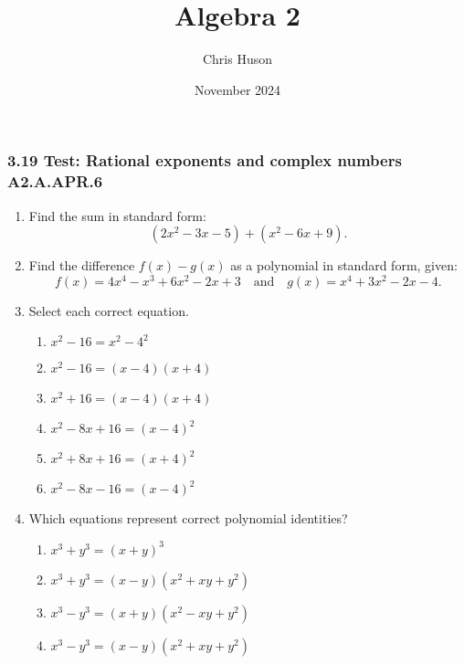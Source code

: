 \documentclass[12pt, twoside]{article}
\title{Algebra 2}
\author{Chris Huson}
\date{November 2024}
\begin{document}
\subsubsection*{3.19 Test: Rational exponents and complex numbers \hfill A2.A.APR.6}
\begin{enumerate}[itemsep=0.5cm]
\subsubsection*{A2-APR.1 Perform operations with polynomials}
\item Find the sum in standard form:
\[
(2x^2 - 3x - 5) + (x^2 - 6x + 9).
\] \vspace{4cm}

\item Find the difference \(f(x) - g(x)\) as a polynomial in standard form, given:
\[
f(x) = 4x^4 - x^3 + 6x^2 - 2x + 3 \quad \text{and} \quad g(x) = x^4 + 3x^2 - 2x - 4.
\] \vspace{4cm}

\item Select each correct equation.
\begin{multicols}{2}
    \begin{enumerate}
    \item $x^2 - 16 = x^2 - 4^2$
    \item $x^2 - 16 = (x-4)(x+4)$
    \item $x^2 + 16 = (x-4)(x+4)$
    \item $x^2 - 8x + 16 = (x-4)^2$
    \item $x^2 + 8x + 16 = (x+4)^2$
    \item $x^2 - 8x - 16 = (x-4)^2$
    \end{enumerate}
\end{multicols}
        
\item Which equations represent correct polynomial identities?
\begin{multicols}{2}
    \begin{enumerate}
    \item \(x^3 + y^3 = (x + y)^3\)
    \item \(x^3 + y^3 = (x - y)(x^2 + xy + y^2)\)
    \item \(x^3 - y^3 = (x + y)(x^2 - xy + y^2)\)
    \item \(x^3 - y^3 = (x - y)(x^2 + xy + y^2)\)
\end{enumerate}
\end{multicols}
    

\end{enumerate}
\end{document}

